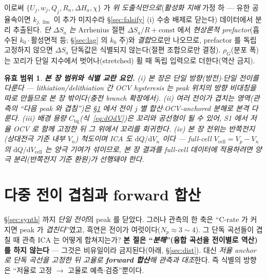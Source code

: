 \documentclass[11pt,a4paper]{article}
\newtheorem*{boundbox}{유효 범위}
\newcommand{\dd}{\mathrm{d}}
\newcommand{\cell}{\mathrm{cell}}
\newcommand{\bg}{\mathrm{bg}}
\begin{document}
이로써 $\{U_j,w_j,Q_j,R_n,\Delta H_a,\chi\}$ 가 \emph{위 도출식만으로}(\emph{활성화 지배} 가정 하 — 유한 공율속이면
$k_{j,\lim}$ 이 추가 미지수라 \S\ref{sec:falsify} (i) 수송 배제로 닫는다) 데이터에서 분리 추출된다. \emph{단 $\Delta S_a$ 는}
Arrhenius 절편 $\Delta S_a/R+\text{const}$ 에서 \emph{현상론적 prefactor}(흡수된 $k_0\cdot$활성면적 등; \S\ref{sec:lag} 의
$k_0$ 주)와 \emph{결합}으로만 나오므로, prefactor 를 독립 고정하지 않으면 $\Delta S_a$ 단독값은 식별되지 않는다(절편
조합으로만 결정). $\rho_G$(분포 폭)는 꼬리가 단일 지수에서 벗어나(stretched) 휠 때 독립 입력으로 더한다(역산 금지).
\begin{boundbox}
\textbf{본 장 범위와 식별 교란 요인.} (i) 본 장은 \emph{단일 방향}(방전)$\cdot$단일 전이를 다룬다 —
lithiation/delithiation 간 OCV hysteresis 는 peak 위치의 방향 비대칭을 따로 만들므로 본 장 밖이다(충전 branch
확장에서). (ii) 여러 전이가 겹치는 영역(관측의 ``다음 peak 와 겹침'')은 \S\ref{sec:overlap} 에서 전이 $j$ 별
합산$\cdot$OCV-anchored 분해로 본격 다룬다. (iii) 배경 용량 $C_\bg$(식~\eqref{eq:dQdV})은 꼬리와 공선형이
될 수 있어, S1 에서 저율 OCV 로 함께 고정한 뒤 그 위에서 꼬리를 회귀한다. (iv) 본 장 전위는 \emph{반쪽전지}(상대전극
기준 내부 $V_n$) 척도이며 ICA 도 $\dd Q/\dd V_n$ 이다 — full-cell $V_\cell=V_p-V_n$ 의 $\dd Q/\dd V_\cell$ 는 양극
기여가 섞이므로, 본 장 결과를 full-cell 데이터에 적용하려면 양극 분리(반쪽전지 기준 환원)가 선행돼야 한다.
\end{boundbox}

\section{다중 전이 겹침과 forward 합산}\label{sec:overlap}
\S\ref{sec:synth} 까지 \emph{단일 전이}의 peak 를 닫았다. 그러나 관측의 한 축은 ``C-rate 가 커지면 peak 가
\emph{겹친다}''였고, 흑연은 전이가 여럿이다($N_p\approx3\sim4$). 그 단독 곡선들이 겹칠 때 관측 ICA 는 어떻게
합쳐지는가? \textbf{본 절은 ``\emph{분해}''(융합 곡선을 전이별로 역산)를 하지 않는다} — 그것은 비유일이라
금지된다(아래, \S\ref{sec:dist}). 대신 \emph{저율 anchor 로 단독 곡선을 고정한 뒤 고율로 \textbf{forward 합산}해
관측과 대조}한다. 즉 식별의 방향은 ``저율로 고정 $\to$ 고율로 예측$\cdot$검증''뿐이다.
\end{document}
